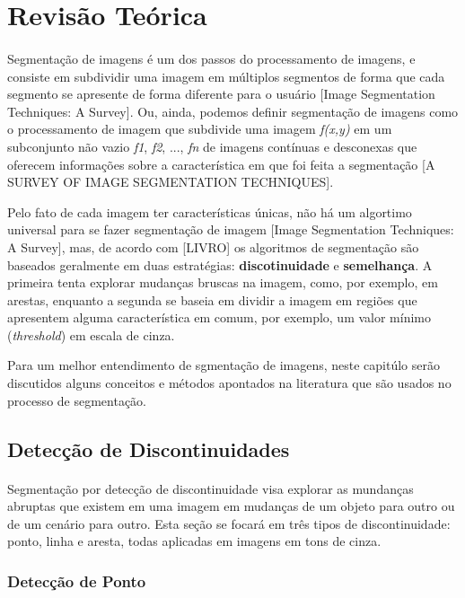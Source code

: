 \section{Revisão Teórica}
\paragraph*{}Segmentação de imagens é um dos passos do processamento de imagens, e consiste em subdividir uma imagem em múltiplos segmentos de forma que cada segmento se apresente de forma diferente para o usuário [Image Segmentation Techniques: A Survey]. Ou, ainda, podemos definir segmentação de imagens como o processamento de imagem que subdivide uma imagem \textit{f(x,y)} em um subconjunto não vazio \textit{f1}, \textit{f2}, ..., \textit{fn} de imagens contínuas e desconexas que oferecem informações sobre a característica em que foi feita a segmentação [A SURVEY OF IMAGE SEGMENTATION TECHNIQUES].

Pelo fato de cada imagem ter características únicas, não há um algortimo universal para se fazer segmentação de imagem [Image Segmentation Techniques: A Survey], mas, de acordo com [LIVRO] os algoritmos de segmentação são baseados geralmente em duas estratégias: \textbf{discotinuidade} e \textbf{semelhança}. A primeira tenta explorar mudanças bruscas na imagem, como, por exemplo, em arestas, enquanto a segunda se baseia em dividir a imagem em regiões que apresentem alguma característica em comum, por exemplo, um valor mínimo (\textit{threshold}) em escala de cinza.

Para um melhor entendimento de sgmentação de imagens, neste capitúlo serão discutidos alguns conceitos e métodos apontados na literatura que são usados no processo de segmentação.

\subsection{Detecção de Discontinuidades}
\paragraph*{}Segmentação por detecção de discontinuidade visa explorar as mundanças abruptas que existem em uma imagem em mudanças de um objeto para outro ou de um cenário para outro. Esta seção se focará em três tipos de discontinuidade: ponto, linha e aresta, todas aplicadas em imagens em tons de cinza.

\subsubsection{Detecção de Ponto}
